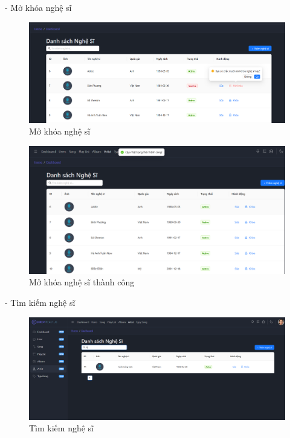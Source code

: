 - Mở khóa nghệ sĩ
\begin{figure}[H]
    \centering
    \includegraphics[width=1\textwidth]{imgs/chap5/ql_nghe_si_9.png}
    \caption{Mở khóa nghệ sĩ}
\end{figure}
\begin{figure}[H]
    \centering
    \includegraphics[width=1\textwidth]{imgs/chap5/ql_nghe_si_10.png}
    \caption{Mở khóa nghệ sĩ thành công}
\end{figure}

- Tìm kiếm nghệ sĩ
\begin{figure}[H]
    \centering
    \includegraphics[width=1\textwidth]{imgs/chap5/ql_nghe_si_8.png}
    \caption{Tìm kiếm nghệ sĩ}
\end{figure}

